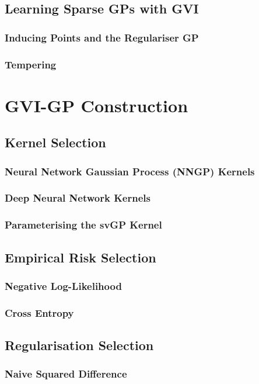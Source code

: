 \documentclass{article}
\numberwithin{equation}{section}
\begin{document}
\subsection{Learning Sparse GPs with GVI}
\subsubsection{Inducing Points and the Regulariser GP}
\subsubsection{Tempering}


\newpage
\section{GVI-GP Construction}
\subsection{Kernel Selection}
\subsubsection{Neural Network Gaussian Process (NNGP) Kernels}
\subsubsection{Deep Neural Network Kernels}
\subsubsection{Parameterising the svGP Kernel}
\subsection{Empirical Risk Selection}
\subsubsection{Negative Log-Likelihood}
\subsubsection{Cross Entropy}
\subsection{Regularisation Selection}
\subsubsection{Naive Squared Difference}
\end{document}

